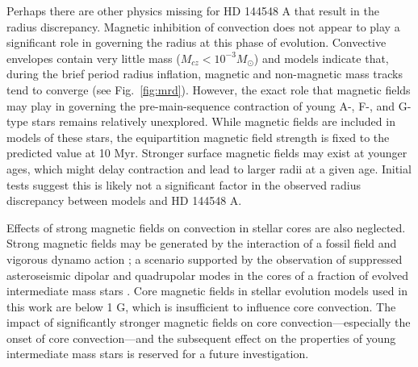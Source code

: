 \documentclass{aa}
\begin{document}
Perhaps there are other physics missing for HD 144548 A that result in the radius discrepancy. Magnetic inhibition of convection does not appear to play a significant role in governing the radius at this phase of evolution. Convective envelopes contain very little mass ($M_{cz} < 10^{-3} M_{\odot}$) and models indicate that, during the brief period radius inflation, magnetic and non-magnetic mass tracks tend to converge (see Fig.~\ref{fig:mrd}). However, the exact role that magnetic fields may play in governing the pre-main-sequence contraction of young A-, F-, and G-type stars remains relatively unexplored. While magnetic fields are included in models of these stars, the equipartition magnetic field strength is fixed to the predicted value at 10 Myr. Stronger surface magnetic fields may exist at younger ages, which might delay contraction and lead to larger radii at a given age. Initial tests suggest this is likely not a significant factor in the observed radius discrepancy between models and HD 144548 A.

Effects of strong magnetic fields on convection in stellar cores are also neglected. Strong magnetic fields may be generated by the interaction of a fossil field and vigorous dynamo action \citep[e.g.,][]{Featherstone2009}; a scenario supported by the observation of suppressed asteroseismic dipolar and quadrupolar modes in the cores of a fraction of evolved intermediate mass stars \citep{Fuller2015,Stello2016a,Cantiello2016}. Core magnetic fields in stellar evolution models used in this work are below 1 G, which is insufficient to influence core convection. The impact of significantly stronger magnetic fields on core convection---especially the onset of core convection---and the subsequent effect on the properties of young intermediate mass stars is reserved for a future investigation. 
\end{document}
